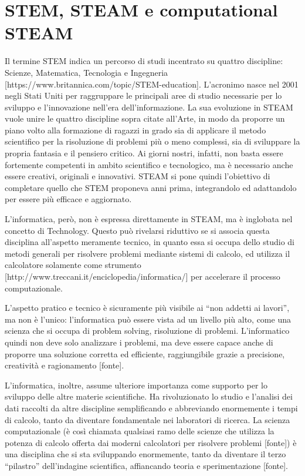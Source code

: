 \chapter{STEM, STEAM e computational STEAM}
Il termine STEM indica un percorso di studi incentrato su quattro discipline: Scienze, Matematica, Tecnologia e Ingegneria [https://www.britannica.com/topic/STEM-education]. L’acronimo nasce nel 2001 negli Stati Uniti per raggruppare le principali aree di studio necessarie per lo sviluppo e l’innovazione nell’era dell’informazione. La sua evoluzione in STEAM vuole unire le quattro discipline sopra citate all’Arte, in modo da proporre un piano volto alla formazione di ragazzi in grado sia di applicare il metodo scientifico per la risoluzione di problemi più o meno complessi, sia di sviluppare la propria fantasia e il pensiero critico. Ai giorni nostri, infatti, non basta essere fortemente competenti in ambito scientifico e tecnologico, ma è necessario anche essere creativi, originali e innovativi. STEAM si pone quindi l’obiettivo di completare quello che STEM proponeva anni prima, integrandolo ed adattandolo per essere più efficace e aggiornato. 

L’informatica, però, non è espressa direttamente in STEAM, ma è inglobata nel concetto di Technology. Questo può rivelarsi riduttivo se si associa questa disciplina all’aspetto meramente tecnico, in quanto essa si occupa dello studio di metodi generali per risolvere problemi mediante sistemi di calcolo, ed utilizza il calcolatore solamente come strumento [http://www.treccani.it/enciclopedia/informatica/] per accelerare il processo computazionale.

L’aspetto pratico e tecnico è sicuramente più visibile ai “non addetti ai lavori”, ma non è l’unico: l’informatica può essere vista ad un livello più alto, come una scienza che si occupa di problem solving, risoluzione di problemi. L’informatico quindi non deve solo analizzare i problemi, ma deve essere capace anche di proporre una soluzione corretta ed efficiente, raggiungibile grazie a precisione, creatività e ragionamento [fonte].

L’informatica, inoltre, assume ulteriore importanza come supporto per lo sviluppo delle altre materie scientifiche. Ha rivoluzionato lo studio e l’analisi dei dati raccolti da altre discipline semplificando e abbreviando enormemente i tempi di calcolo, tanto da diventare fondamentale nei laboratori di ricerca. La scienza computazionale (è così chiamata qualsiasi ramo delle scienze che utilizza la potenza di calcolo offerta dai moderni calcolatori per risolvere problemi [fonte]) è una disciplina che si sta sviluppando enormemente, tanto da diventare il terzo “pilastro” dell’indagine scientifica, affiancando teoria e sperimentazione [fonte].

